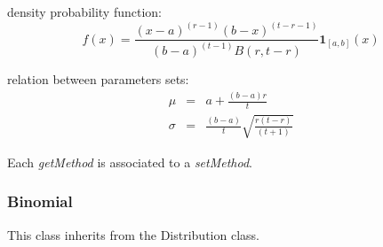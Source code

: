 \begin{description}
\begin{description}
\end{description}


\item[Details:]  \rule{0pt}{1em}
\begin{description}
\item density probability function:
\begin{equation}
f(x) = \frac{(x-a)^{(r-1)}(b-x)^{(t-r-1)}}{(b-a)^{(t-1)}B(r,t-r)}\boldsymbol{1}_{[a,b]}(x)
\end{equation}
\item relation between parameters sets:
\begin{equation}
\begin{array}{lcl}
\mu & = & \displaystyle a + \frac{(b - a)  r}{ t} \\
\sigma & = & \displaystyle  \frac{(b - a)}{ t}\sqrt{\frac{r (t - r)}{ (t + 1)}}
\end{array}
\end{equation}
\end{description}

\item[Links:]  \rule{0pt}{1em}
\end{description}

Each  \textit{getMethod}  is associated to a \textit{setMethod}.


\newpage
\subsubsection{Binomial}

This class inherits from the Distribution class.

